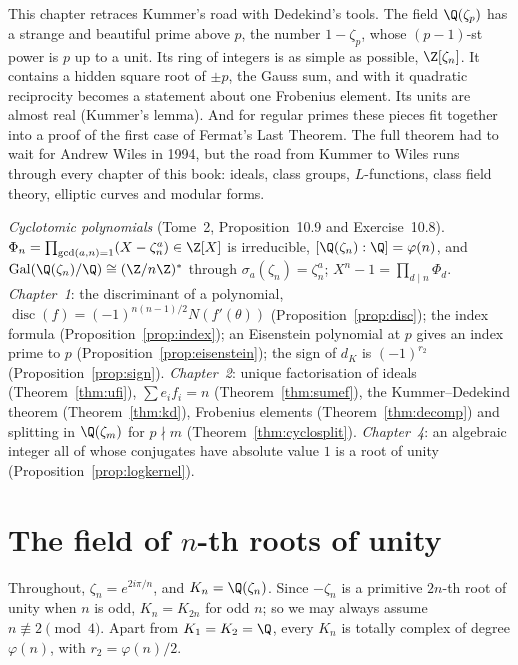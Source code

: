 This chapter retraces Kummer's road with Dedekind's tools. The field $\Q(\zeta_p)$ has a strange and beautiful prime above
$p$, the number $1-\zeta_p$, whose $(p-1)$-st power is $p$ up to a unit. Its ring of integers is as simple as possible,
$\Z[\zeta_n]$. It contains a hidden square root of $\pm p$, the Gauss sum, and with it quadratic reciprocity becomes a
statement about one Frobenius element. Its units are almost real (Kummer's lemma). And for regular primes these pieces fit
together into a proof of the first case of Fermat's Last Theorem. The full theorem had to wait for Andrew Wiles in 1994,
but the road from Kummer to Wiles runs through every chapter of this book: ideals, class groups, $L$-functions, class
field theory, elliptic curves and modular forms.

\begin{reminder}
\emph{Cyclotomic polynomials} (Tome~2, Proposition~10.9 and Exercise~10.8). $\Phi_n=\prod_{\gcd(a,n)=1}(X-\zeta_n^a)\in\Z[X]$
is irreducible, $[\Q(\zeta_n):\Q]=\varphi(n)$, and $\operatorname{Gal}(\Q(\zeta_n)/\Q)\cong(\Z/n\Z)^*$ through
$\sigma_a(\zeta_n)=\zeta_n^a$; $X^n-1=\prod_{d\mid n}\Phi_d$. \emph{Chapter~1}: the discriminant of a polynomial,
$\operatorname{disc}(f)=(-1)^{n(n-1)/2}N(f'(\theta))$ (Proposition~\ref{prop:disc}); the index formula (Proposition~\ref{prop:index});
an Eisenstein polynomial at $p$ gives an index prime to $p$ (Proposition~\ref{prop:eisenstein}); the sign of $d_K$ is
$(-1)^{r_2}$ (Proposition~\ref{prop:sign}). \emph{Chapter~2}: unique factorisation of ideals (Theorem~\ref{thm:ufi}),
$\sum e_if_i=n$ (Theorem~\ref{thm:sumef}), the Kummer--Dedekind theorem (Theorem~\ref{thm:kd}), Frobenius elements
(Theorem~\ref{thm:decomp}) and splitting in $\Q(\zeta_m)$ for $p\nmid m$ (Theorem~\ref{thm:cyclosplit}). \emph{Chapter~4}: an
algebraic integer all of whose conjugates have absolute value $1$ is a root of unity (Proposition~\ref{prop:logkernel}).
\end{reminder}

\section{The field of $n$-th roots of unity}

Throughout, $\zeta_n=e^{2i\pi/n}$, and $K_n=\Q(\zeta_n)$. Since $-\zeta_n$ is a primitive $2n$-th root of unity when $n$ is
odd, $K_n=K_{2n}$ for odd $n$; so we may always assume $n\not\equiv2\pmod4$. Apart from $K_1=K_2=\Q$, every $K_n$ is
totally complex of degree $\varphi(n)$, with $r_2=\varphi(n)/2$.

